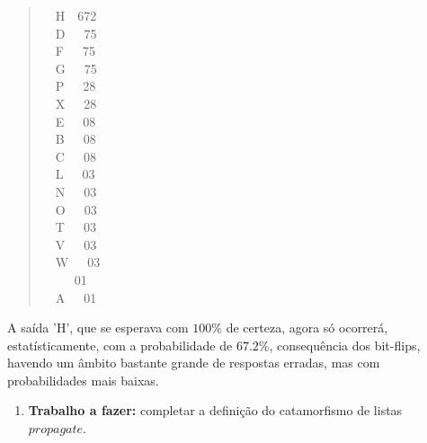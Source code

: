 \documentclass[a4paper]{article}
\newcommand{\Varid}[1]{\mathit{#1}}
\begin{document}
\begin{quote}\small
\begin{tabbing}\ttfamily
~~H~~672\\
\ttfamily ~~D~~~75\\
\ttfamily ~~F~~~75\\
\ttfamily ~~G~~~75\\
\ttfamily ~~P~~~28\\
\ttfamily ~~X~~~28\\
\ttfamily ~~E~~~08\\
\ttfamily ~~B~~~08\\
\ttfamily ~~C~~~08\\
\ttfamily ~~L~~~03\\
\ttfamily ~~N~~~03\\
\ttfamily ~~O~~~03\\
\ttfamily ~~T~~~03\\
\ttfamily ~~V~~~03\\
\ttfamily ~~W~~~03\\
\ttfamily ~~~~~01\\
\ttfamily ~~A~~~01
\end{tabbing}
\end{quote}
A saída 'H', que se esperava com \ensuremath{\mathrm{100}\mathbin{\%}} de certeza,
agora só ocorrerá, estatísticamente, com a probabilidade de \ensuremath{\mathrm{67.2}\mathbin{\%}},
consequência dos bit-flips, havendo um âmbito bastante
grande de respostas erradas, mas com probabilidades mais baixas.

\begin{enumerate}
\item \textbf{Trabalho a fazer:} completar a definição do catamorfismo de listas \ensuremath{\Varid{propagate}}.
\end{enumerate}
\end{document}
